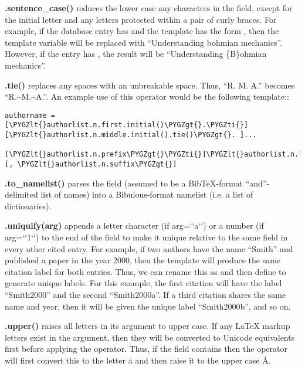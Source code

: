 \documentclass[letterpaper,10pt,english]{sphinxmanual}
\def\PYGZlt{\char`\<}
\def\PYGZgt{\char`\>}
\def\PYGZti{\char`\~}
\begin{document}
\textbf{.sentence\_case()} reduces the lower case any characters in the field, except for the initial letter and any letters protected within a pair of curly braces. For example, if the database entry has  and the template has the form , then the template variable will be replaced with ``Understanding bohmian mechanics''. However, if the entry has , the result will be ``Understanding \{B\}ohmian mechanics''.

\textbf{.tie()} replaces any spaces with an unbreakable space. Thus, ``R. M. A.'' becomes ``R.\textasciitilde{}M.\textasciitilde{}A.''. An example use of this operator would be the following template::

\begin{Verbatim}[commandchars=\\\{\}]
authorname = [\PYGZlt{}authorlist.n.first.initial()\PYGZgt{}.\PYGZti{}][\PYGZlt{}authorlist.n.middle.initial().tie()\PYGZgt{}. ]...
             [\PYGZlt{}authorlist.n.prefix\PYGZgt{}\PYGZti{}]\PYGZlt{}authorlist.n.last\PYGZgt{}[, \PYGZlt{}authorlist.n.suffix\PYGZgt{}]
\end{Verbatim}

\textbf{.to\_namelist()} parses the field (assumed to be a BibTeX-format ``and''-delimited list of names) into a Bibulous-format namelist (i.e. a list of dictionaries).

\textbf{.uniquify(arg)} appends a letter character (if arg={}`{}`a{}`{}`) or a number (if arg={}`{}`1{}`{}`) to the end of the field to make it unique relative to the same field in every other cited entry. For example, if two authors have the name ``Smith'' and published a paper in the year 2000, then the template  will produce the same citation label for both entries. Thus, we can rename this as  and then define  to generate unique labels. For this example, the first citation will have the label ``Smith2000'' and the second ``Smith2000a''. If a third citation shares the same name and year, then it will be given the unique label ``Smith2000b'', and so on.

\textbf{.upper()} raises all letters in its argument to upper case. If any LaTeX markup letters exist in the argument, then they will be converted to Unicode equivalents first before applying the operator. Thus, if the field  contains  then the operator will first convert this to the letter å and then raise it to the upper case Å.
\end{document}
